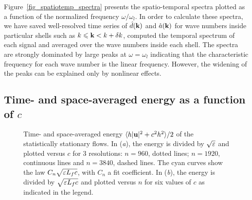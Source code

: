 Figure~\ref{fig_spatiotemp_spectra} presents the spatio-temporal
spectra plotted as a function of the normalized frequency
$\omega/\omega_l$.
In order to calculate these spectra, we have saved well-resolved time
series of $\hat d(\textbf{k})$ and $\hat a(\textbf{k})$ for wave numbers inside
particular shells such as $k\leqslant \textbf{k}<k+\delta k$, computed the
temporal spectrum of each signal and averaged over the wave numbers
inside each shell.
%
The spectra are strongly dominated by large peaks at $\omega =
\omega_l$ indicating that the characteristic frequency for each wave
number is the linear frequency.  However, the widening of the peaks
can be explained only by nonlinear effects.  












\subsection{Time- and space-averaged energy as a function of $c$}

\begin{figure}
\caption{Time- and space-averaged energy 
$\langle h|\textbf{u}|^2 + c^2 h^2 \rangle/2$ 
of the statistically stationary flows.
%
In (\textit{a}), the energy is divided by 
$\sqrt{\varepsilon}$ and plotted versus $c$ for 3 resolutions:
$n = 960$, dotted lines; 
$n = 1920$, continuous lines and 
$n = 3840$, dashed lines. 
The cyan curves show the law $C_n \sqrt{\varepsilon L_f c}$, 
with $C_n$ a fit coefficient.
%
In (\textit{b}), the energy is divided by 
$\sqrt{\varepsilon L_f c}$ and plotted versus $n$
for six values of $c$ as indicated in the legend.
}
\label{fig_Evsc}
\end{figure}



